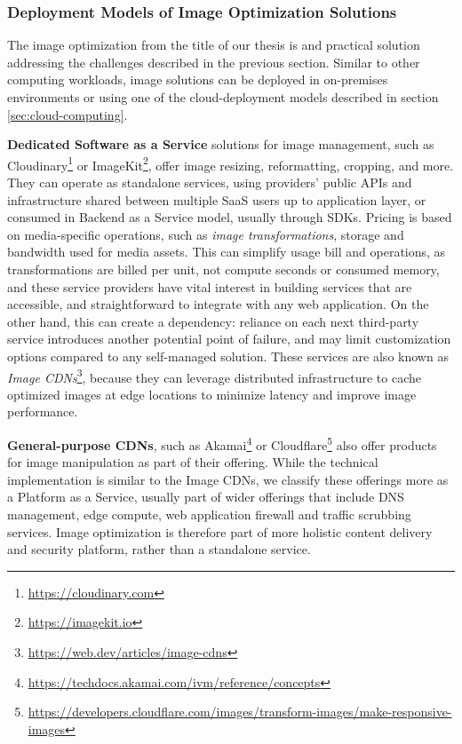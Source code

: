 \subsubsection{Deployment Models of Image Optimization Solutions}
\label{sec:deployment-methods-if-image-optimization}

The image optimization from the title of our thesis is and practical solution addressing the challenges described in the previous section. Similar to other computing workloads, image solutions can be deployed in on-premises environments or using one of the cloud-deployment models described in section \ref{sec:cloud-computing}.

\textbf{Dedicated Software as a Service} solutions for image management, such as Cloudinary\footnote{\url{https://cloudinary.com}} or ImageKit\footnote{\url{https://imagekit.io}}, offer image resizing, reformatting, cropping, and more. They can operate as standalone services, using providers' public APIs and infrastructure shared between multiple SaaS users up to application layer, or consumed in Backend as a Service model, usually through SDKs. Pricing is based on media-specific operations, such as \emph{image transformations}, storage and bandwidth used for media assets. This can simplify usage bill and operations, as transformations are billed per unit, not compute seconds or consumed memory, and these service providers have vital interest in building services that are accessible, and straightforward to integrate with any web application. On the other hand, this can create a dependency: reliance on each next third-party service introduces another potential point of failure, and may limit customization options compared to any self-managed solution. These services are also known as \emph{Image CDNs}\footnote{\url{https://web.dev/articles/image-cdns}}, because they can leverage distributed infrastructure to cache optimized images at edge locations to minimize latency and improve image performance.

\textbf{General-purpose CDNs}, such as Akamai\footnote{\url{https://techdocs.akamai.com/ivm/reference/concepts}} or Cloudflare\footnote{\url{https://developers.cloudflare.com/images/transform-images/make-responsive-images}} also offer products for image manipulation as part of their offering. While the technical implementation is similar to the Image CDNs, we classify these offerings more as a Platform as a Service, usually part of wider offerings that include DNS management, edge compute, web application firewall and traffic scrubbing services. Image optimization is therefore part of more holistic content delivery and security platform, rather than a standalone service.

